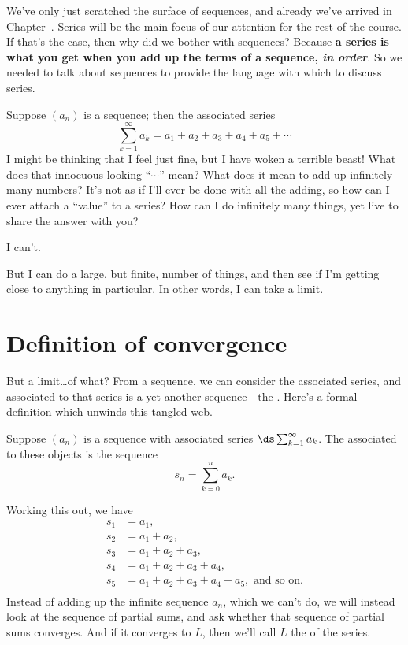 \nobreak We've only just scratched the surface of sequences, and
already we've arrived in Chapter~.  Series will
be the main focus of our attention for the rest of the course.  If
that's the case, then why did we bother with sequences?  Because
\textbf{a series is what you get when you add up the terms of a
  sequence, \textit{in order}}.  So we needed to talk about sequences
to provide the language with which to discuss series.

Suppose $(a_n)$ is a sequence; then the associated series
$$\sum_{k=1}^\infty a_k=a_1+a_2+a_3+a_4+a_5+\cdots$$
I might be thinking that I feel just fine, but I have woken a terrible
beast!  What does that innocuous looking ``$\cdots$'' mean?  What does
it mean to add up infinitely many numbers?  It's not as if I'll ever
be done with all the adding, so how can I ever attach a ``value'' to a
series?  How can I do infinitely many things, yet live to share the
answer with you?

I can't.

But I can do a large, but finite, number of things, and then see if
I'm getting close to anything in particular.  In other words, I can
take a limit.

\section{Definition of convergence}
\label{section:series-definition}

But a limit\ldots of what?  From a sequence, we can consider the
associated series, and associated to that series is a yet another
sequence---the .  Here's a formal definition which unwinds this tangled web.
\begin{definition}
  Suppose $(a_n)$ is a sequence with associated series
  $\ds\sum_{k=1}^\infty a_k$.  The 
  associated to these objects is the sequence
 $$
 s_n = \sum_{k=0}^n a_k.
 $$
 \end{definition}
Working this out, we have
\begin{align*}
  s_1&=a_1, \\
  s_2&=a_1+a_2,\\ 
  s_3&=a_1+a_2+a_3, \\
  s_4&=a_1+a_2+a_3+a_4, \\
  s_5&=a_1+a_2+a_3+a_4+a_5, \mbox{ and so on.}\\
\end{align*}
Instead of adding up the infinite sequence $a_n$, which we can't do,
we will instead look at the sequence of partial sums, and ask whether
that sequence of partial sums converges.  And if it converges to $L$,
then we'll call $L$ the  of the series.

